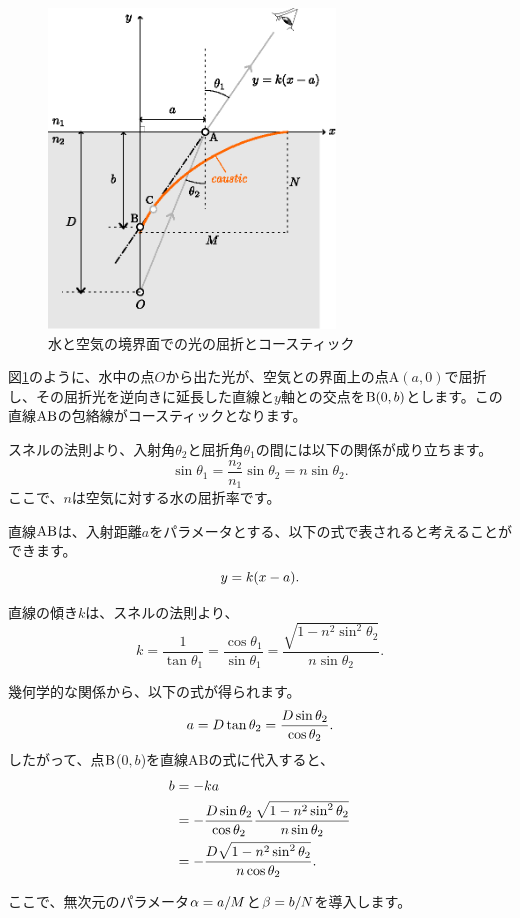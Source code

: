 \documentclass[twocolumn]{article}
\begin{document}
	\begin{figure}[ht]
		\centering
		\includegraphics[width=3in]{figs/g237.eps}
		\caption{水と空気の境界面での光の屈折とコースティック}
		\label{fig:geometry}
	\end{figure}
	
	図\ref{fig:geometry}のように、水中の点$O$から出た光が、空気との界面上の点A$(a, 0)$で屈折し、その屈折光を逆向きに延長した直線と$y$軸との交点を${\mathrm{{B}}}(0, b)$とします。この直線${\mathrm{{A}{B}}}$の包絡線がコースティックとなります。
	
	スネルの法則より、入射角$\theta_2$と屈折角$\theta_1$の間には以下の関係が成り立ちます。
	$$ \sin\theta_1 = \frac{n_2}{n_1} \sin\theta_2 = n\sin\theta_2.$$
	ここで、$n$は空気に対する水の屈折率です。
	
	直線${\mathrm{{A}{B}}}$は、入射距離$a$をパラメータとする、以下の式で表されると考えることができます。
	$$y=k(x-{a}).$$
	
	直線の傾き$k$は、スネルの法則より、
	$$k=\dfrac{1}{\tan\theta_1}=\dfrac{\cos\theta_1}{\sin\theta_1}
	=\dfrac{\sqrt{1-n^2\sin^2\theta_2}}{n\sin\theta_2}.$$
	
	幾何学的な関係から、以下の式が得られます。
	$${a} = D\tan\theta_2 = \dfrac{D\sin\theta_2}{\cos\theta_2}.$$
	したがって、点$\mathrm{{B}}$($0, b$)を直線ABの式に代入すると、
	$$\begin{aligned}
		{b} &= -k{a} \\
		&= -\dfrac{D\sin\theta_2}{\cos\theta_2}
		\dfrac{\sqrt{1-n^2\sin^2\theta_2}}{n\sin\theta_2}\\
		&=-\dfrac{D\sqrt{1-n^2\sin^2\theta_2}}{n\cos\theta_2}.
	\end{aligned}$$
	
	ここで、無次元のパラメータ${\alpha}={a}/M$と${\beta}={b}/N$を導入します。
	
\end{document}
